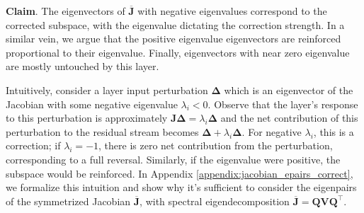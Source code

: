 \textbf{Claim}. The eigenvectors of $\overline{\mathbf{J}}$ with negative eigenvalues correspond to the corrected subspace, with the eigenvalue dictating the correction strength. In a similar vein, we argue that the positive eigenvalue eigenvectors are reinforced proportional to their eigenvalue. Finally, eigenvectors with near zero eigenvalue are mostly untouched by this layer.

Intuitively, consider a layer input perturbation $\mathbf{\Delta}$ which is an eigenvector of the Jacobian with some negative eigenvalue $\lambda_i < 0$. Observe that the layer's response to this perturbation is approximately $\mathbf{J}\mathbf{\Delta} = \lambda_i \mathbf{\Delta}$ and the net contribution of this perturbation to the residual stream becomes $\mathbf{\Delta} + \lambda_i \mathbf{\Delta}$. For negative $\lambda_i$, this is a correction; if $\lambda_i = -1$, there is zero net contribution from the perturbation, corresponding to a full reversal. Similarly, if the eigenvalue were positive, the subspace would be reinforced. In Appendix \ref{appendix:jacobian_epairs_correct}, we formalize this intuition and show why it's sufficient to consider the eigenpairs of the symmetrized Jacobian $\overline{\mathbf{J}}$, with spectral eigendecomposition $\overline{\mathbf{J}} = \mathbf{Q}\mathbf{V}\mathbf{Q^\top}$.





